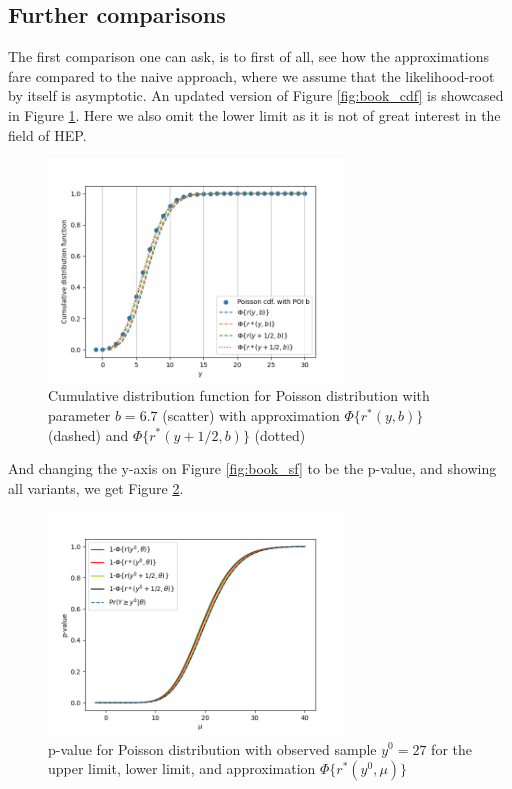 \documentclass[14pt, a4paper]{article}  %
\begin{document}
\subsection{Further comparisons}
The first comparison one can ask, is to first of all, see how the approximations fare compared to the naive approach, where we assume that the likelihood-root by itself is asymptotic. An updated version of Figure \ref{fig:book_cdf} is showcased in Figure \ref{fig:book_cdf_fr}. Here we also omit the lower limit as it is not of great interest in the field of HEP.
\begin{figure}[!ht]
	\centering
        \includegraphics[width=0.7\textwidth]{Book_examples_further/book_cdf.png}
	\caption{Cumulative distribution function for Poisson distribution with parameter $b=6.7$ (scatter) with approximation $\Phi\{r^*(y,b)\}$ (dashed) and $\Phi\{r^*(y+1/2,b)\}$ (dotted)}\label{fig:book_cdf_fr}
\end{figure} 
And changing the y-axis on Figure \ref{fig:book_sf} to be the p-value, and showing all variants, we get Figure \ref{fig:book_sf_fr}.
\begin{figure}[!ht]
	\centering
        \includegraphics[width=0.7\textwidth]{Book_examples_further/book_sig.png}
	\caption{p-value for Poisson distribution with observed sample $y^0=27$ for the upper limit, lower limit, and approximation $\Phi\{r^*(y^0,\mu)\}$}\label{fig:book_sf_fr}
\end{figure} 
\end{document}
